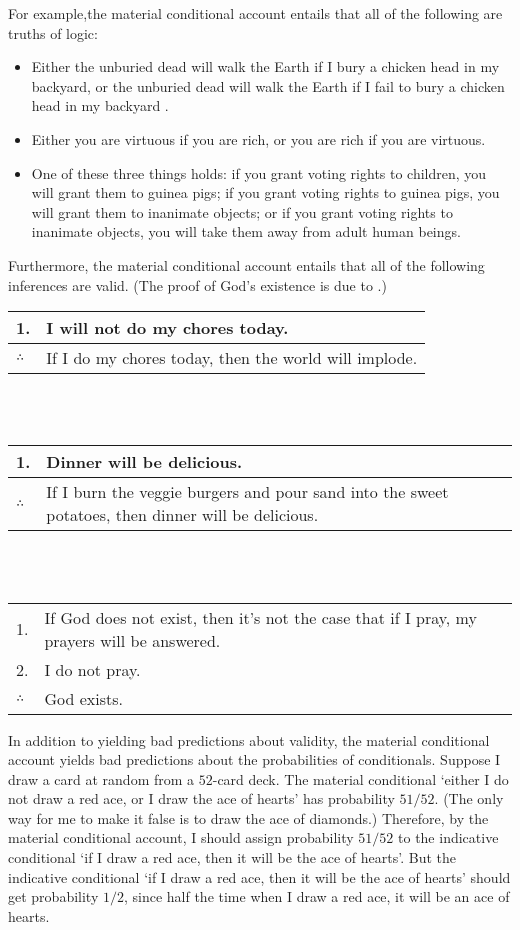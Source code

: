 For example,the material conditional account entails that all of the following are truths of logic:
%
\begin{itemize}
\item[] Either the unburied dead will walk the Earth if I bury a chicken head in my backyard, or the unburied dead will walk the Earth if I fail to bury a chicken head in my backyard \citep{mcgee-trouble}.
\item[] Either you are virtuous if you are rich, or you are rich if you are virtuous.
\item[] One of these three things holds: if you grant voting rights to children, you will grant them to guinea pigs; if you grant voting rights to guinea pigs, you will grant them to inanimate objects; or if you grant voting rights to inanimate objects, you will take them away from adult human beings.
\end{itemize}
%
Furthermore, the material conditional account entails that all of the following inferences are valid.  (The proof of God's existence is due to \citealp{Edgington1986-EDGDCH}.)\smallskip\\
\begin{tabular}{ll}
1. & I will not do my chores today.\\
\hline
$\therefore$ & If I do my chores today, then the world will implode.
\end{tabular}\\\smallskip\\
\begin{tabular}{p{}p{}}
1. & Dinner will be delicious.\\
\hline
$\therefore$ & If I burn the veggie burgers and pour sand into the sweet potatoes, then dinner will be delicious.
\end{tabular}\\\smallskip\\
\begin{tabular}{p{}p{}}
1. & If God does not exist, then it's not the case that if I pray, my prayers will be answered.\\
2. & I do not pray.\\
\hline
$\therefore$ & God exists.
\end{tabular}

\medskip

In addition to yielding bad predictions about validity, the material conditional account yields bad predictions about the probabilities of conditionals.  Suppose I draw a card at random from a $52$-card deck.  The material conditional `either I do not draw a red ace, or I draw the ace of hearts' has probability $51/52$.  (The only way for me to make it false is to draw the ace of diamonds.)  Therefore, by the material conditional account, I should assign probability $51/52$ to the indicative conditional `if I draw a red ace, then it will be the ace of hearts'. But the indicative conditional `if I draw a red ace, then it will be the ace of hearts' should get probability $1/2$, since half the time when I draw a red ace, it will be an ace of hearts.

